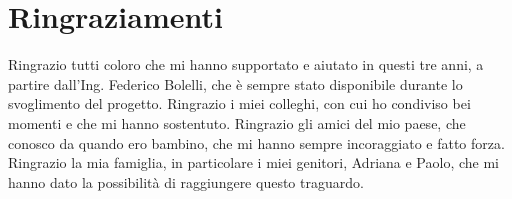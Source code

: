 \chapter*{Ringraziamenti}


Ringrazio tutti coloro che mi hanno supportato e aiutato in questi tre anni, a partire dall'Ing. Federico Bolelli, che è sempre stato disponibile durante lo svoglimento del progetto. Ringrazio i miei colleghi, con cui ho condiviso bei momenti e che mi hanno sostentuto. Ringrazio gli amici del mio paese, che conosco da quando ero bambino, che mi hanno sempre incoraggiato e fatto forza. Ringrazio la mia famiglia, in particolare i miei genitori, Adriana e Paolo, che mi hanno dato la possibilità di raggiungere questo traguardo.